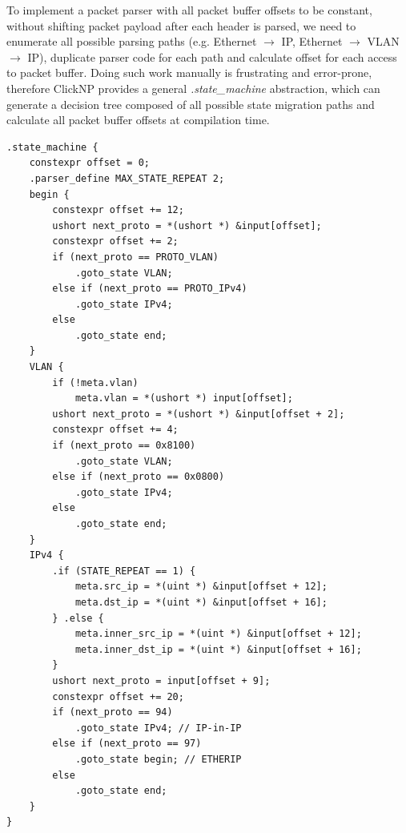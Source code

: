 
To implement a packet parser with all packet buffer offsets to be constant, without shifting packet payload after each header is parsed, we need to enumerate all possible parsing paths (e.g. Ethernet $\rightarrow$ IP, Ethernet $\rightarrow$ VLAN $\rightarrow$ IP), duplicate parser code for each path and calculate offset for each access to packet buffer. Doing such work manually is frustrating and error-prone, therefore ClickNP provides a general \textit{.state\_machine} abstraction, which can generate a decision tree composed of all possible state migration paths and calculate all packet buffer offsets at compilation time.

\begin{lstlisting}
.state_machine {
    constexpr offset = 0;
    .parser_define MAX_STATE_REPEAT 2;
    begin {
        constexpr offset += 12;
        ushort next_proto = *(ushort *) &input[offset];
        constexpr offset += 2;
        if (next_proto == PROTO_VLAN)
            .goto_state VLAN;
        else if (next_proto == PROTO_IPv4)
            .goto_state IPv4;
        else
            .goto_state end;
    }
    VLAN {
        if (!meta.vlan)
            meta.vlan = *(ushort *) input[offset];
        ushort next_proto = *(ushort *) &input[offset + 2];
        constexpr offset += 4;
        if (next_proto == 0x8100)
            .goto_state VLAN;
        else if (next_proto == 0x0800)
            .goto_state IPv4;
        else
            .goto_state end;
    }
    IPv4 {
        .if (STATE_REPEAT == 1) {
            meta.src_ip = *(uint *) &input[offset + 12];
            meta.dst_ip = *(uint *) &input[offset + 16];
        } .else {
            meta.inner_src_ip = *(uint *) &input[offset + 12];
            meta.inner_dst_ip = *(uint *) &input[offset + 16];
        }
        ushort next_proto = input[offset + 9];
        constexpr offset += 20;
        if (next_proto == 94)
            .goto_state IPv4; // IP-in-IP
        else if (next_proto == 97)
            .goto_state begin; // ETHERIP
        else
            .goto_state end;
    }
}
\end{lstlisting}


